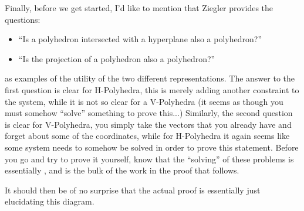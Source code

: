 \medskip
Finally, before we get started, I'd like to mention that Ziegler provides the questions:
\begin{itemize}
  \item ``Is a polyhedron intersected with a hyperplane also a polyhedron?''
  \item ``Is the projection of a polyhedron also a polyhedron?''
\end{itemize}
as examples of the utility of the two different representations.  The answer to the first question is clear for H-Polyhedra, this is merely adding another constraint to the system, while it is not so clear for a V-Polyhedra (it seems as though you must somehow ``solve'' something to prove this...)  Similarly, the second question is clear for V-Polyhedra, you simply take the vectors that you already have and forget about some of the coordinates, while for H-Polyhedra it again seems like some system needs to somehow be solved in order to prove this statement.  Before you go and try to prove it yourself, know that the ``solving'' of these problems is essentially \FME, and is the bulk of the work in the proof that follows.

It should then be of no surprise that the actual proof is essentially just elucidating this diagram.




